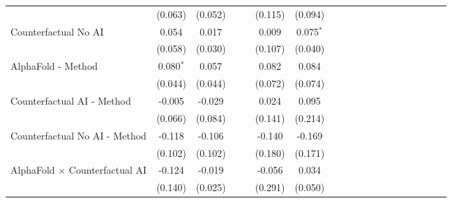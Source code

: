 \begin{tabular}{lcccccccccccccccccc}
                                                              & (0.063)     & (0.052) &     &     & (0.115)       & (0.094)       &     &     &     &      &      &      &      &      &      &      &      &   \\   
   Counterfactual No AI                                       & 0.054       & 0.017   &     &     & 0.009         & 0.075$^{*}$   &     &     &     &      &      &      &      &      &      &      &      &   \\   
                                                              & (0.058)     & (0.030) &     &     & (0.107)       & (0.040)       &     &     &     &      &      &      &      &      &      &      &      &   \\   
   AlphaFold - Method                                         & 0.080$^{*}$ & 0.057   &     &     & 0.082         & 0.084         &     &     &     &      &      &      &      &      &      &      &      &   \\   
                                                              & (0.044)     & (0.044) &     &     & (0.072)       & (0.074)       &     &     &     &      &      &      &      &      &      &      &      &   \\   
   Counterfactual AI - Method                                 & -0.005      & -0.029  &     &     & 0.024         & 0.095         &     &     &     &      &      &      &      &      &      &      &      &   \\   
                                                              & (0.066)     & (0.084) &     &     & (0.141)       & (0.214)       &     &     &     &      &      &      &      &      &      &      &      &   \\   
   Counterfactual No AI - Method                              & -0.118      & -0.106  &     &     & -0.140        & -0.169        &     &     &     &      &      &      &      &      &      &      &      &   \\   
                                                              & (0.102)     & (0.102) &     &     & (0.180)       & (0.171)       &     &     &     &      &      &      &      &      &      &      &      &   \\   
   AlphaFold $\times$ Counterfactual AI                       & -0.124      & -0.019  &     &     & -0.056        & 0.034         &     &     &     &      &      &      &      &      &      &      &      &   \\   
                                                              & (0.140)     & (0.025) &     &     & (0.291)       & (0.050)       &     &     &     &      &      &      &      &      &      &      &      &   \\   

\end{tabular}
